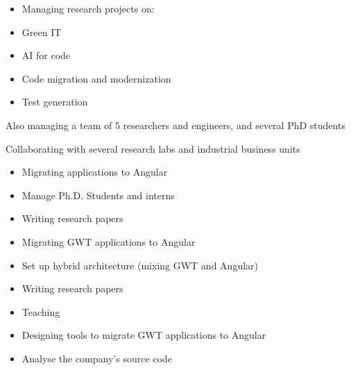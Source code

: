 \documentclass[10pt,a4paper,ragged2e,withhyper]{altacv}
\begin{document}
\begin{paracol}{2}


\begin{itemize}
\item Managing research projects on:
\item Green IT
\item AI for code
\item Code migration and modernization
\item Test generation
\end{itemize}

Also managing a team of 5 researchers and engineers, and several PhD students

Collaborating with several research labs and industrial business units

\divider


\begin{itemize}
  \item Migrating applications to Angular
  \item Manage Ph.D. Students and interns
  \item Writing research papers
\end{itemize}

\divider


\begin{itemize}
  \item Migrating GWT applications to Angular
  \item Set up hybrid architecture (mixing GWT and Angular)
  \item Writing research papers
  \item Teaching
\end{itemize}

\divider


\begin{itemize}
  \item Designing tools to migrate GWT applications to Angular
  \item Analyse the company's source code
\end{itemize}


\end{paracol}
\end{document}
